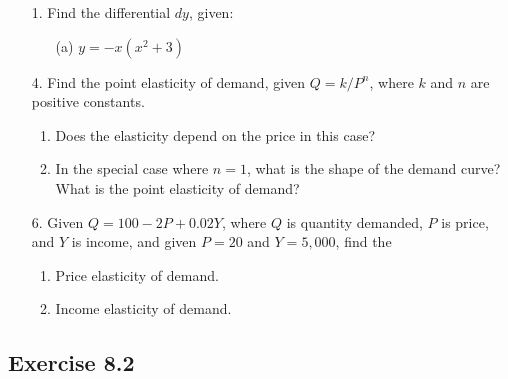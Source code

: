 \documentclass{./../../Latex/homework}
\begin{document}
\begin{enumerate}

\item[1.] Find the differential $d y$, given:
\begin{itemize}
\item[(a)] $y=-x\left(x^{2}+3\right)$
\end{itemize}

\item[4.] Find the point elasticity of demand, given $Q=k / P^{n}$, where $k$ and $n$ are positive constants.
\begin{enumerate}
 \item Does the elasticity depend on the price in this case?
\item In the special case where $n=1$, what is the shape of the demand curve? What is the point elasticity of demand?
\end{enumerate}

\item[6.] Given $Q=100-2 P+0.02 Y$, where $Q$ is quantity demanded, $P$ is price, and $Y$ is income, and given $P=20$ and $Y=5,000$, find the
\begin{enumerate}
\item Price elasticity of demand.
\item Income elasticity of demand.
\end{enumerate}

\end{enumerate}

\subsection*{Exercise 8.2}
\end{document}
